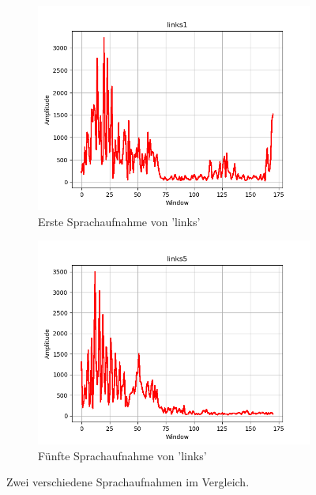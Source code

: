 \documentclass[12pt, oneside, a4paper, \docLanguage]{report}
\begin{document}
\begin{figure}[H]
\centering
	\begin{subfigure}{.5\textwidth}
  		\centering
 		 \includegraphics[width=.95\linewidth]{../data/img/Versuch2/hoch/links1AlleRichtig.png}
  		\caption{Erste Sprachaufnahme von 'links'}
 		 \label{fig:sub1}
	\end{subfigure}%
	\begin{subfigure}{.5\textwidth}
  		\centering
 		 \includegraphics[width=.95\linewidth]{../data/img/Versuch2/hoch/links5AlleRichtig.png}
  		\caption{Fünfte Sprachaufnahme von 'links'}
  		\label{fig:sub2}
	\end{subfigure}
	\caption{Zwei verschiedene Sprachaufnahmen im Vergleich.}
	\label{fig:test}
\end{figure}
\newpage
\end{document}
